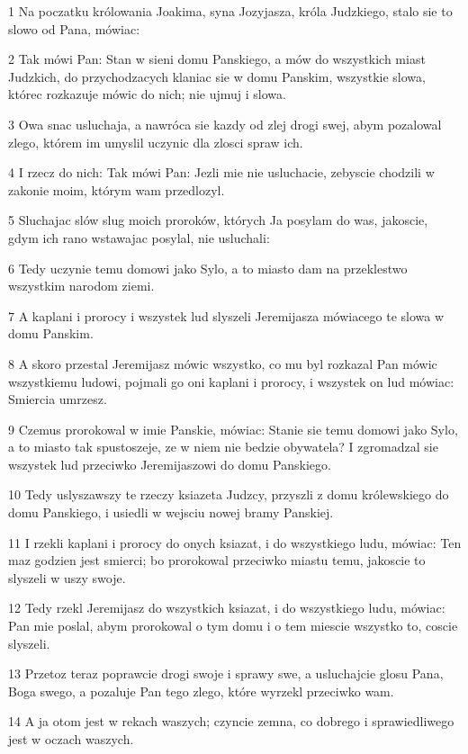 \par 1 Na poczatku królowania Joakima, syna Jozyjasza, króla Judzkiego, stalo sie to slowo od Pana, mówiac:
\par 2 Tak mówi Pan: Stan w sieni domu Panskiego, a mów do wszystkich miast Judzkich, do przychodzacych klaniac sie w domu Panskim, wszystkie slowa, którec rozkazuje mówic do nich; nie ujmuj i slowa.
\par 3 Owa snac usluchaja, a nawróca sie kazdy od zlej drogi swej, abym pozalowal zlego, którem im umyslil uczynic dla zlosci spraw ich.
\par 4 I rzecz do nich: Tak mówi Pan: Jezli mie nie usluchacie, zebyscie chodzili w zakonie moim, którym wam przedlozyl.
\par 5 Sluchajac slów slug moich proroków, których Ja posylam do was, jakoscie, gdym ich rano wstawajac posylal, nie usluchali:
\par 6 Tedy uczynie temu domowi jako Sylo, a to miasto dam na przeklestwo wszystkim narodom ziemi.
\par 7 A kaplani i prorocy i wszystek lud slyszeli Jeremijasza mówiacego te slowa w domu Panskim.
\par 8 A skoro przestal Jeremijasz mówic wszystko, co mu byl rozkazal Pan mówic wszystkiemu ludowi, pojmali go oni kaplani i prorocy, i wszystek on lud mówiac: Smiercia umrzesz.
\par 9 Czemus prorokowal w imie Panskie, mówiac: Stanie sie temu domowi jako Sylo, a to miasto tak spustoszeje, ze w niem nie bedzie obywatela? I zgromadzal sie wszystek lud przeciwko Jeremijaszowi do domu Panskiego.
\par 10 Tedy uslyszawszy te rzeczy ksiazeta Judzcy, przyszli z domu królewskiego do domu Panskiego, i usiedli w wejsciu nowej bramy Panskiej.
\par 11 I rzekli kaplani i prorocy do onych ksiazat, i do wszystkiego ludu, mówiac: Ten maz godzien jest smierci; bo prorokowal przeciwko miastu temu, jakoscie to slyszeli w uszy swoje.
\par 12 Tedy rzekl Jeremijasz do wszystkich ksiazat, i do wszystkiego ludu, mówiac: Pan mie poslal, abym prorokowal o tym domu i o tem miescie wszystko to, coscie slyszeli.
\par 13 Przetoz teraz poprawcie drogi swoje i sprawy swe, a usluchajcie glosu Pana, Boga swego, a pozaluje Pan tego zlego, które wyrzekl przeciwko wam.
\par 14 A ja otom jest w rekach waszych; czyncie zemna, co dobrego i sprawiedliwego jest w oczach waszych.
